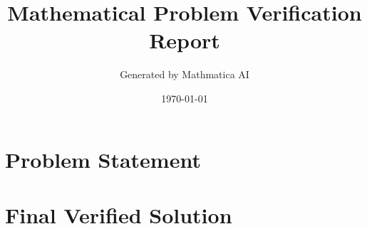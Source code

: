 \documentclass[12pt, a4paper]{article}
\title{\textbf{Mathematical Problem Verification Report}}
\author{Generated by Mathmatica AI}
\date{\today}
\begin{document}
\maketitle
\thispagestyle{empty}
\newpage

\section*{Problem Statement}

\section*{Final Verified Solution}
\end{document}
